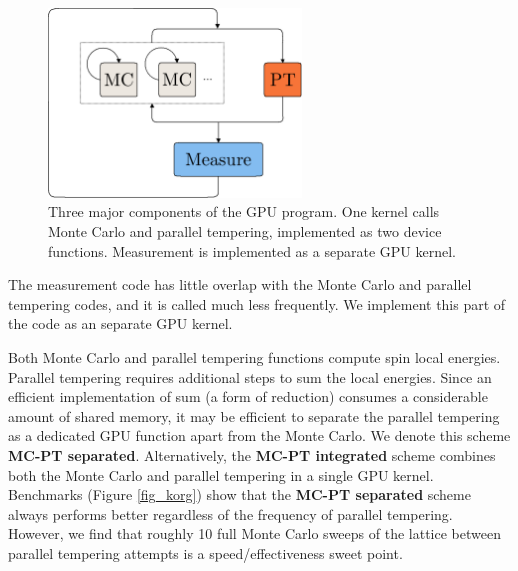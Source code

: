 \begin{figure}[ht]
  \centering
  \includegraphics[width=0.6\textwidth] {img/skeleton2_.pdf}
  \caption{Three major components of the GPU program. 
One kernel calls Monte Carlo and parallel tempering, implemented as 
two device functions. Measurement is implemented as a separate GPU kernel.} 
  \label{fig_korg1}
  \end{figure}

The measurement code has little overlap with the Monte Carlo and
parallel tempering codes, and it is called much less frequently. We
implement this part of the code as an separate GPU kernel.

Both Monte Carlo and parallel tempering functions compute spin local
energies. Parallel tempering requires additional steps to sum the
local energies. Since an efficient implementation of sum (a form
of reduction)
consumes a considerable amount of shared memory, it may be efficient
to separate the parallel tempering as a dedicated GPU function
apart from the Monte Carlo. We denote this scheme {\bf MC-PT
  separated}. Alternatively, the {\bf MC-PT integrated} scheme
combines both the Monte Carlo and parallel tempering in a single GPU
kernel. Benchmarks (Figure \ref{fig_korg}) show that the 
{\bf MC-PT separated} scheme always performs better regardless of the frequency of
parallel tempering. However, we find that roughly 10 full Monte Carlo
sweeps of the lattice between parallel tempering attempts is a
speed/effectiveness sweet point.

